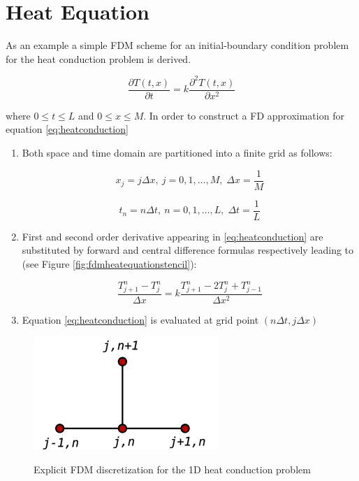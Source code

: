     \section{Heat Equation}
        As an example a simple FDM scheme for an initial-boundary condition problem for the heat conduction problem is derived. 
    
\begin{equation}
    \frac{\partial T(t,x)}{\partial t}= k\frac{\partial^2
      T(t,x)}{\partial x^2}
      \label{eq:heatconduction}
\end{equation}
 
    where $0 \leq t \leq L$ and $0 \leq x \leq
    M$. 
 In order to construct a FD approximation for equation \ref{eq:heatconduction} 
 
 \begin{enumerate}
 
 \item Both space and time domain are partitioned into a finite grid as follows:
    
    \begin{equation}
    		x_j = j\Delta x, \: j = 0,1,\ldots,M,\;\Delta x = \frac{1}{M}
    \end{equation}

 \begin{equation}
    		t_n = n\Delta t, \: n = 0,1,\ldots,L,\; \Delta t= \frac{1}{L}
    \end{equation}  
    
 \item  First and second order derivative appearing in \ref{eq:heatconduction} are substituted by forward and central difference formulas respectively leading to (see Figure  \ref{fig:fdmheatequationstencil}):
 
 \begin{equation}
  \frac{T^n_{j+1} - T^n_{j}}{\Delta x} = k \frac{T^n_{j+1}- 2T^n_{j} + T^n_{j-1}}{\Delta x^2}
 \label{eq:discretizedheatequation}
 \end{equation}
 
 \item Equation \ref{eq:heatconduction} is evaluated at grid point $(n\Delta t, j \Delta x)$ 
    
\end{enumerate}    
    
\begin{figure}
\centering
\includegraphics[scale=0.5]{./images/CA_FDM/heatstencil}
\label{fig:fdmheatequationstencil}
\caption{Explicit FDM discretization for the 1D heat conduction problem}\label{torus}
\end{figure}    
    
